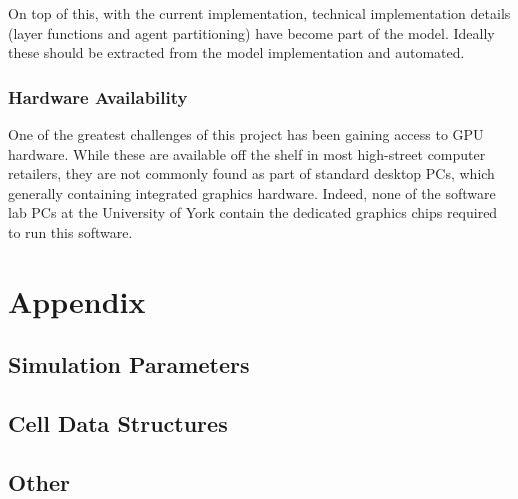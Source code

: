 \documentclass{UoYCSproject}
\begin{document}
On top of this, with the current implementation, technical implementation details (layer functions and agent partitioning) have become part of the model.
Ideally these should be extracted from the model implementation and automated.

\subsection{Hardware Availability}
One of the greatest challenges of this project has been gaining access to GPU hardware.
While these are available off the shelf in most high-street computer retailers, they are not commonly found as part of standard desktop PCs, which generally containing integrated graphics hardware.
Indeed, none of the software lab PCs at the University of York contain the dedicated graphics chips required to run this software.

\printbibliography
\chapter{Appendix}
\section{Simulation Parameters}


\section{Cell Data Structures}

\section{Other}
\end{document}
